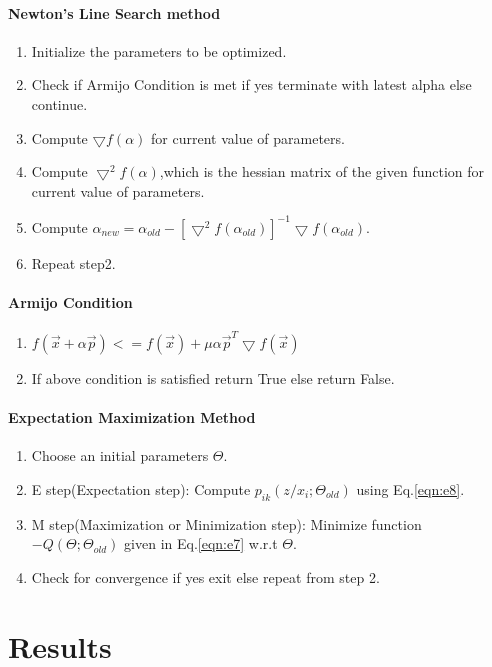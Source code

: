 \documentclass[paper=a4, fontsize=11pt]{scrartcl}
\numberwithin{equation}{section}		%
\numberwithin{figure}{section}			%
\numberwithin{table}{section}				%
\begin{document}
\paragraph{Newton's Line Search method}
\begin{enumerate}
  \item Initialize the parameters to be optimized.
  \item Check if Armijo Condition is met if yes terminate with latest alpha else continue.
  \item Compute $\bigtriangledown f(\alpha)$ for current value of parameters.
  \item Compute $\bigtriangledown^2 f(\alpha)$,which is the hessian matrix of the given function for current value of parameters.
  \item Compute $\alpha_{new}=\alpha_{old}-[\bigtriangledown^2 f(\alpha_{old})]^{-1} \bigtriangledown f(\alpha_{old})$.
  \item Repeat step2.
\end{enumerate}

\paragraph{Armijo Condition}
\begin{enumerate}
  \item $f(\vec{x}+\alpha \vec{p})<=f(\vec{x})+\mu \alpha \vec{p}^T \bigtriangledown f(\vec{x})$
  \item If above condition is satisfied return True else return False.
\end{enumerate}
\paragraph{Expectation Maximization Method}
\begin{enumerate}
  \item Choose an initial parameters $\Theta$.
  \item E step(Expectation step): Compute $p_{ik}(z/x_i;\Theta_{old})$ using Eq.\ref{eqn:e8}.
  \item M step(Maximization or Minimization step): Minimize function $-Q(\Theta;\Theta_{old})$ given in Eq.\ref{eqn:e7} w.r.t $\Theta$.
  \item Check for convergence if yes exit else repeat from step 2.
\end{enumerate}
\section{Results}
\end{document}
